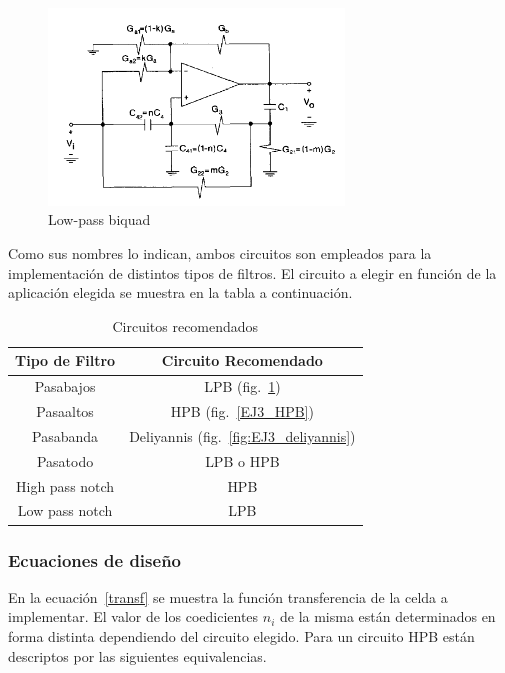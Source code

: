 \begin{figure}[H] 
    \centering
    \includegraphics[width=0.7\textwidth]{../EJ3/Resources/LPB.png}
    \caption{Low-pass biquad}
    \label{EJ3_LPB}
\end{figure}

Como sus nombres lo indican, ambos circuitos son empleados para la implementaci\'on de distintos tipos de filtros. El circuito a elegir en funci\'on de la aplicaci\'on elegida se muestra en la tabla a continuaci\'on.

\begin{table}[H]
    \centering
    \begin{tabular}{c c}
        Tipo de Filtro & Circuito Recomendado \\
        \hline
        Pasabajos & LPB (fig.~\ref{EJ3_LPB}) \\
        Pasaaltos & HPB (fig.~\ref{EJ3_HPB}) \\
        Pasabanda & Deliyannis (fig.~\ref{fig:EJ3_deliyannis}) \\
        Pasatodo & LPB o HPB \\
        High pass notch & HPB \\
        Low pass notch & LPB\\
    \end{tabular}
    \caption{Circuitos recomendados}
    \label{tabla_circuitos}
\end{table}

\subsubsection{Ecuaciones de dise\~no}

En la ecuaci\'on~\ref{transf} se muestra la funci\'on transferencia de la celda a implementar. El valor de los coedicientes $n_i$ de la misma est\'an determinados en forma distinta dependiendo del circuito elegido. Para un circuito HPB est\'an descriptos por las siguientes equivalencias.

